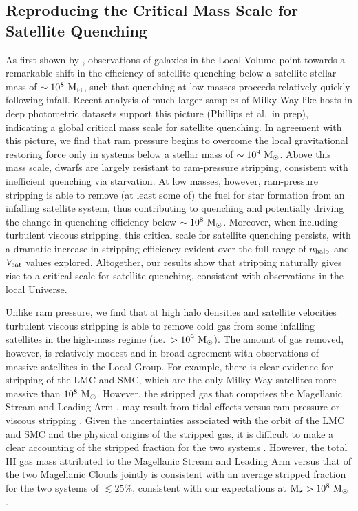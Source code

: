 \subsection{Reproducing the Critical Mass Scale for Satellite Quenching}
\label{subsec:critmass}

As first shown by \citet[][see also \citealt{slater14,
  phillips15a}]{wheeler14}, observations of galaxies in the Local
Volume point towards a remarkable shift in the efficiency of satellite
quenching below a satellite stellar mass of $\sim10^{8}~{\rm M}_{\odot}$, such
that quenching at low masses proceeds relatively quickly following
infall.
%
Recent analysis of much larger samples of Milky Way-like hosts in deep
photometric datasets support this picture (Phillips et al.~in prep),
indicating a global critical mass scale for satellite quenching.
%
In agreement with this picture, we find that ram pressure begins to
overcome the local gravitational restoring force only in systems below
a stellar mass of $\sim10^{9}~{\rm M}_{\odot}$.
%
Above this mass scale, dwarfs are largely resistant to ram-pressure
stripping, consistent with inefficient quenching via starvation.
%
At low masses, however, ram-pressure stripping is able to remove (at
least some of) the fuel for star formation from an infalling satellite
system, thus contributing to quenching and potentially driving the
change in quenching efficiency below $\sim10^{8}~{\rm M}_{\odot}$.
%
Moreover, when including turbulent viscous stripping, this critical
scale for satellite quenching persists, with a dramatic increase in
stripping efficiency evident over the full range of $n_{\rm halo}$ and
$V_{\rm sat}$ values explored. 
%
Altogether, our results show that stripping naturally gives rise to a
critical scale for satellite quenching, consistent with observations
in the local Universe.


Unlike ram pressure, we find that at high halo densities and satellite
velocities turbulent viscous stripping is able to remove cold gas from
some infalling satellites in the high-mass regime
(i.e.~$>10^{9}~{\rm M}_{\odot}$). 
%
The amount of gas removed, however, is relatively modest and in broad
agreement with observations of massive satellites in the Local Group.
%
For example, there is clear evidence for stripping of the LMC and SMC,
which are the only Milky Way satellites more massive than
$10^{8}~{\rm M}_{\odot}$. However, the stripped gas that comprises the
Magellanic Stream and Leading Arm \citep{mathewson74}, may result from
tidal effects \citep[e.g.][]{lin77, besla10, besla12, guglielmo14}
versus ram-pressure or viscous stripping \citep[e.g.][]{md94,
  mastropietro05, salem15, hammer15}.
%
Given the uncertainties associated with the orbit of the LMC and SMC
and the physical origins of the stripped gas, it is difficult to make
a clear accounting of the stripped fraction for the two systems 
\citep[e.g.][]{donghia15}. However, the total H{\scriptsize I} gas
mass attributed to the Magellanic Stream and Leading Arm versus that
of the two Magellanic Clouds jointly is consistent with an average
stripped fraction for the two systems of $\lesssim25\%$, consistent
with our expectations at ${\rm M}_{\star}>10^{8}~{\rm M}_{\odot}$ \citep[see
Fig.~\ref{fig:MW_KH},][]{bruns05, nidever08, nidever10}.



